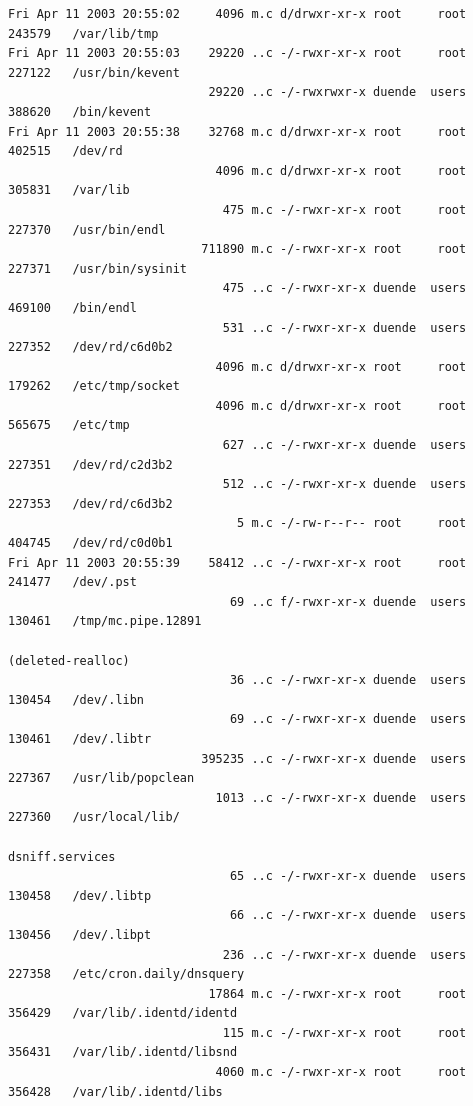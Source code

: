 {\footnotesize
\begin{lstlisting}[style=terminal]
Fri Apr 11 2003 20:55:02     4096 m.c d/drwxr-xr-x root     root     243579   /var/lib/tmp
Fri Apr 11 2003 20:55:03    29220 ..c -/-rwxr-xr-x root     root     227122   /usr/bin/kevent
                            29220 ..c -/-rwxrwxr-x duende  users    388620   /bin/kevent
Fri Apr 11 2003 20:55:38    32768 m.c d/drwxr-xr-x root     root     402515   /dev/rd
                             4096 m.c d/drwxr-xr-x root     root     305831   /var/lib
                              475 m.c -/-rwxr-xr-x root     root     227370   /usr/bin/endl
                           711890 m.c -/-rwxr-xr-x root     root     227371   /usr/bin/sysinit
                              475 ..c -/-rwxr-xr-x duende  users    469100   /bin/endl
                              531 ..c -/-rwxr-xr-x duende  users    227352   /dev/rd/c6d0b2
                             4096 m.c d/drwxr-xr-x root     root     179262   /etc/tmp/socket
                             4096 m.c d/drwxr-xr-x root     root     565675   /etc/tmp
                              627 ..c -/-rwxr-xr-x duende  users    227351   /dev/rd/c2d3b2
                              512 ..c -/-rwxr-xr-x duende  users    227353   /dev/rd/c6d3b2
                                5 m.c -/-rw-r--r-- root     root     404745   /dev/rd/c0d0b1
Fri Apr 11 2003 20:55:39    58412 ..c -/-rwxr-xr-x root     root     241477   /dev/.pst
                               69 ..c f/-rwxr-xr-x duende  users    130461   /tmp/mc.pipe.12891 
                                                                  (deleted-realloc)
                               36 ..c -/-rwxr-xr-x duende  users    130454   /dev/.libn
                               69 ..c -/-rwxr-xr-x duende  users    130461   /dev/.libtr
                           395235 ..c -/-rwxr-xr-x duende  users    227367   /usr/lib/popclean
                             1013 ..c -/-rwxr-xr-x duende  users    227360   /usr/local/lib/
                                                                  dsniff.services
                               65 ..c -/-rwxr-xr-x duende  users    130458   /dev/.libtp
                               66 ..c -/-rwxr-xr-x duende  users    130456   /dev/.libpt
                              236 ..c -/-rwxr-xr-x duende  users    227358   /etc/cron.daily/dnsquery
                            17864 m.c -/-rwxr-xr-x root     root     356429   /var/lib/.identd/identd
                              115 m.c -/-rwxr-xr-x root     root     356431   /var/lib/.identd/libsnd
                             4060 m.c -/-rwxr-xr-x root     root     356428   /var/lib/.identd/libs

\end{lstlisting}}
